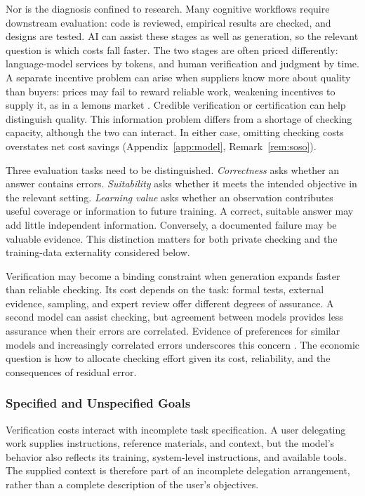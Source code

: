 \documentclass[12pt]{article}
\theoremstyle{plain}
\theoremstyle{definition}
\theoremstyle{remark}
\begin{document}
Nor is the diagnosis confined to research. Many cognitive workflows require downstream evaluation: code is
reviewed, empirical results are checked, and designs are tested. AI can
assist these stages as well as generation, so the relevant question is
which costs fall faster. The two stages are often priced differently: language-model services
by tokens, and human verification and judgment by time.
A separate incentive problem can arise when suppliers know more about
quality than buyers: prices may fail to reward reliable work, weakening incentives
to supply it, as in a lemons market \citep{Akerlof1970}. Credible
verification or certification can help distinguish quality. This
information problem differs from a shortage of checking capacity,
although the two can interact. In either case, omitting checking costs
overstates net cost savings
(Appendix~\ref{app:model}, Remark~\ref{rem:soso}).

Three evaluation tasks need to be distinguished. \emph{Correctness}
asks whether an answer contains errors. \emph{Suitability} asks whether
it meets the intended objective in the relevant setting. \emph{Learning
value} asks whether an observation contributes useful coverage or
information to future training. A correct, suitable answer may add
little independent information. Conversely, a documented failure may be
valuable evidence. This distinction matters for both private checking
and the training-data externality considered below.

Verification may become a binding constraint when generation expands
faster than reliable checking. Its cost depends on the task: formal
tests, external evidence, sampling, and expert review offer different
degrees of assurance. A second model can assist checking, but agreement
between models provides less assurance when their errors are correlated.
Evidence of preferences for similar models and increasingly correlated
errors underscores this concern \citep{GoelEtAl2025ThinkAlike}. The
economic question is how to allocate checking effort given its cost,
reliability, and the consequences of residual error.

\subsubsection{Specified and Unspecified Goals}

Verification costs interact with incomplete task specification. A user
delegating work supplies instructions, reference materials, and context,
but the model's behavior also reflects its training, system-level
instructions, and available tools. The supplied context is therefore
part of an incomplete delegation arrangement, rather than a complete
description of the user's objectives.
\end{document}

